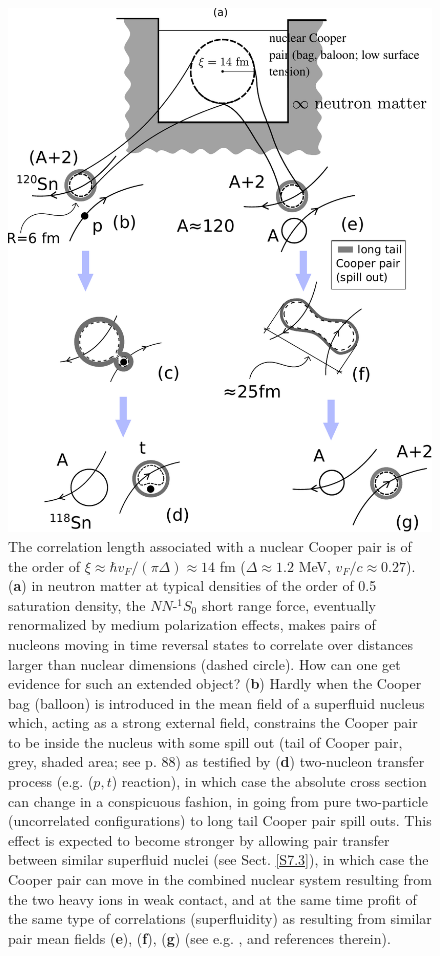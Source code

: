 \begin{figure}
	\centerline{\includegraphics*[width=12cm,angle=0]{nutshell/figs/fig_gamma.pdf}}
\caption{The correlation length associated with a nuclear Cooper pair is of the order of $\xi\approx \hbar v_F/(\pi\Delta)\approx 14 $ fm ($\Delta\approx1.2$ MeV, $v_F/c\approx0.27$).(\textbf{a}) in neutron matter at typical densities of the order of 0.5 saturation density, the $NN$-$^{1}S_0$ short range force, eventually renormalized by medium polarization effects, makes pairs of nucleons moving in time reversal states to correlate over distances larger than nuclear dimensions (dashed circle). How can one get evidence for such an extended object? (\textbf{b}) Hardly when the Cooper bag (balloon) is introduced in  the mean field  of a superfluid nucleus which, acting as a  strong external field, constrains the Cooper pair to be inside the nucleus  with some spill out (tail of Cooper pair, grey, shaded area; see \cite{Bertsch:05} p. 88) as testified by (\textbf{d}) two-nucleon transfer process (e.g. ($p,t$) reaction), in which case the absolute cross section can change in a conspicuous fashion, in going from pure two-particle (uncorrelated configurations) to long tail Cooper pair spill outs. This effect is expected to become stronger by allowing pair transfer between similar superfluid nuclei (see Sect. \ref{S7.3}), in which case the Cooper pair can move in the combined nuclear system resulting from the two heavy ions in weak contact, and at the same time profit of the same type of correlations (superfluidity) as resulting from  similar pair mean fields (\textbf{e}), (\textbf{f}), (\textbf{g}) (see e.g. \cite{Oertzen:13,vonOertzen:01}, and references therein).}\label{fig_gamma}
\end{figure}
